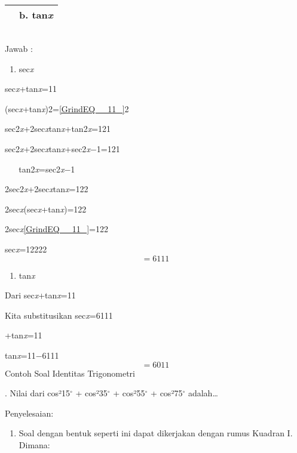 \documentclass[11pt,fleqn]{book} %
\begin{document}
\begin{myEnumerate}
\begin{itemize}
\begin{tabular}{|p{0.0in}|p{0.3in}|} \hline 
 & b. tan\textit{x} \\ \hline 
\end{tabular}



\begin{tabular}{|p{0.0in}|} \hline 
 \\ \hline 
\end{tabular}

Jawab : 

\begin{enumerate}
\item  sec\textit{x}
\end{enumerate}

\noindent sec\textit{x}+tan\textit{x}=11

\noindent (sec\textit{x}+tan\textit{x})2=\eqref{GrindEQ__11_}2

\noindent sec2\textit{x}+2sec\textit{x}tan\textit{x}+tan2\textit{x}=121

\noindent sec2\textit{x}+2sec\textit{x}tan\textit{x}+sec2\textit{x}$\mathrm{-}$1=121

\noindent ~ ~ tan2\textit{x}=sec2\textit{x}$\mathrm{-}$1

\noindent 2sec2\textit{x}+2sec\textit{x}tan\textit{x}=122

\noindent 2sec\textit{x}(sec\textit{x}+tan\textit{x})=122

\noindent 2sec\textit{x}\eqref{GrindEQ__11_}=122

\noindent sec\textit{x}=12222
\[=6111\] 

\begin{enumerate}
\item  tan\textit{x}
\end{enumerate}

\noindent Dari sec\textit{x}+tan\textit{x}=11

\noindent Kita substitusikan sec\textit{x}=6111

+tan\textit{x}=11

\noindent tan\textit{x}=11$\mathrm{-}$6111
\[=6011\] 
Contoh Soal Identitas Trigonometri

. Nilai dari cos²15${}^\circ$ + cos²35${}^\circ$ + cos²55${}^\circ$ + cos²75${}^\circ$ adalah{\dots}

\noindent Penyelesaian:

\begin{enumerate}
\item  Soal dengan bentuk seperti ini dapat dikerjakan dengan rumus Kuadran I. Dimana:
\end{enumerate}


\end{itemize}
\end{myEnumerate}
\end{document}
